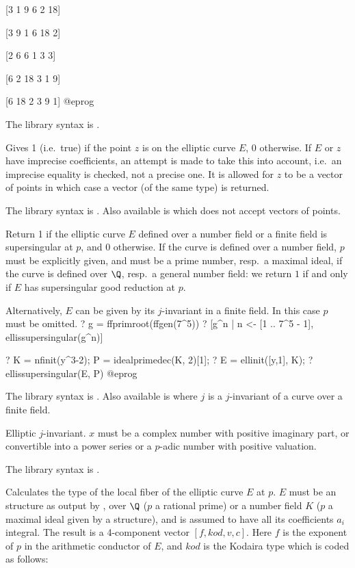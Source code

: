 [3  1  9 6  2 18]

[3  9  1 6 18  2]

[2  6  6 1  3  3]

[6  2 18 3  1  9]

[6 18  2 3  9  1]
@eprog

The library syntax is .

\label{se:ellisoncurve}
Gives 1 (i.e.~true) if the point $z$ is on the elliptic curve $E$, 0
otherwise. If $E$ or $z$ have imprecise coefficients, an attempt is made to
take this into account, i.e.~an imprecise equality is checked, not a precise
one. It is allowed for $z$ to be a vector of points in which case a vector
(of the same type) is returned.

The library syntax is .
Also available is  which does not
accept vectors of points.

\label{se:ellissupersingular}
Return 1 if the elliptic curve $E$ defined over a number field
or a finite field is supersingular at $p$, and $0$ otherwise.
If the curve is defined over a number field, $p$ must be explicitly given,
and must be a prime number, resp.~a maximal ideal, if the curve is defined
over $\Q$, resp.~a general number field: we return $1$ if and only if $E$
has supersingular good reduction at $p$.

Alternatively, $E$ can be given by its $j$-invariant in a finite field. In
this case $p$ must be omitted.
\bprog
? g = ffprimroot(ffgen(7^5))
? [g^n | n <- [1 .. 7^5 - 1], ellissupersingular(g^n)]

? K = nfinit(y^3-2); P = idealprimedec(K, 2)[1];
? E = ellinit([y,1], K);
? ellissupersingular(E, P)
@eprog

The library syntax is .
Also available is
 where $j$ is a $j$-invariant of a curve
over a finite field.

\label{se:ellj}
Elliptic $j$-invariant. $x$ must be a complex number
with positive imaginary part, or convertible into a power series or a
$p$-adic number with positive valuation.

The library syntax is .

\label{se:elllocalred}
Calculates the  type of the local fiber of the elliptic curve
$E$ at $p$. $E$ must be an  structure as output by
, over $\Q$ ($p$ a rational prime) or a number field $K$ ($p$
a maximal ideal given by a  structure), and is assumed to have all
its coefficients $a_i$ integral.
The result is a 4-component vector $[f,kod,v,c]$. Here $f$ is the exponent of
$p$ in the arithmetic conductor of $E$, and $kod$ is the Kodaira type which
is coded as follows:

